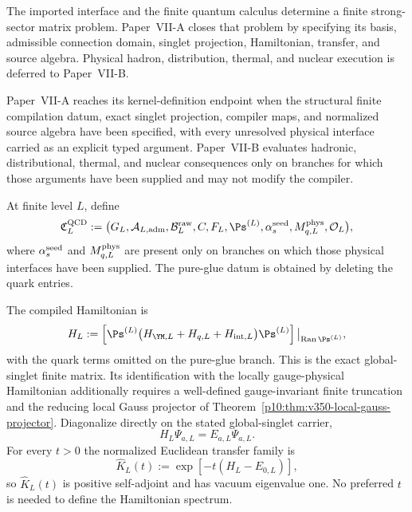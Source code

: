 \documentclass[12pt,a4paper]{article}
\providecommand{\alphasseed}{\alpha_s^{\rm seed}}
\begin{document}
The imported interface and the finite quantum calculus determine a finite
strong-sector matrix problem.  Paper~VII-A closes that problem by specifying its
basis, admissible connection domain, singlet projection, Hamiltonian, transfer,
and source algebra.  Physical hadron, distribution, thermal, and nuclear
execution is deferred to Paper~VII-B.

\begin{definition}
\label{p10:def:qcd-compiler-endpoint}
Paper~VII-A reaches its kernel-definition endpoint when the structural finite compilation datum, exact singlet projection, compiler maps, and normalized source algebra have been specified, with every unresolved physical interface carried as an explicit typed argument.  Paper~VII-B evaluates hadronic, distributional, thermal, and nuclear consequences only on branches for which those arguments have been supplied and may not modify the compiler.
\end{definition}

\begin{definition}
\label{p10:def:finite-qcd-compilation-datum}
At finite level \(L\), define
\begin{equation}
\label{p10:eq:finite-qcd-compilation-datum}
\mathfrak C_L^{\rm QCD}:=
\bigl(G_L,\mathcal A_{L,{\rm adm}},\mathcal B_L^{\rm raw},C,F_L,\Ps^{(L)},\alphasseed,M_{q,L}^{\rm phys},\mathcal O_L\bigr),
\end{equation}
where \(\alphasseed\) and \(M_{q,L}^{\rm phys}\) are present only on branches on which those physical interfaces have been supplied.  The pure-glue datum is obtained by deleting the quark entries.
\end{definition}

\begin{definition}
\label{p10:def:compiled-finite-strong-matrices}
The compiled Hamiltonian is
\begin{equation}
\label{p10:eq:compiled-hamiltonian-matrix}
H_L:=\left[\Ps^{(L)}\bigl(H_{\YM,L}+H_{q,L}+H_{{\rm int},L}\bigr)\Ps^{(L)}\right]\big|_{\operatorname{Ran}\Ps^{(L)}},
\end{equation}
with the quark terms omitted on the pure-glue branch. This is the exact global-singlet finite matrix. Its identification with the locally gauge-physical Hamiltonian additionally requires a well-defined gauge-invariant finite truncation and the reducing local Gauss projector of Theorem~\ref{p10:thm:v350-local-gauss-projector}. Diagonalize directly on the stated global-singlet carrier,
\begin{equation}
\label{p10:eq:compiled-energy-eigenvalues}
H_L\Psi_{a,L}=E_{a,L}\Psi_{a,L}.
\end{equation}
For every \(t>0\) the normalized Euclidean transfer family is
\begin{equation}
\label{p10:eq:compiled-transfer-matrix}
\widehat K_L(t):=\exp[-t(H_L-E_{0,L})],
\end{equation}
so \(\widehat K_L(t)\) is positive self-adjoint and has vacuum eigenvalue one.  No preferred \(t\) is needed to define the Hamiltonian spectrum.
\end{definition}
\end{document}
